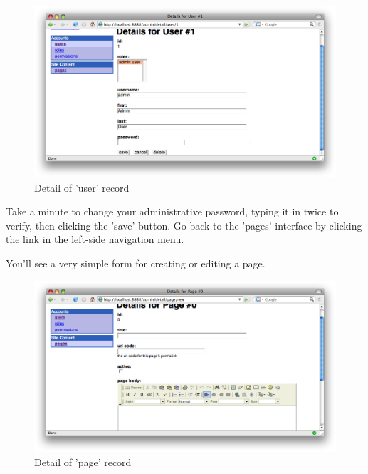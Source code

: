 \begin{figure}[ht]
\centering
\includegraphics[width=1\textwidth]{images/admin-intro/05-user-detail.png}
\caption{Detail of 'user' record}
\end{figure}

Take a minute to change your administrative password, typing it in twice to
verify, then clicking the 'save' button. Go back to the 'pages' interface by
clicking the link in the left-side navigation menu.

You'll see a very simple form for creating or editing a page.

\begin{figure}[ht]
\centering
\includegraphics[width=1\textwidth]{images/admin-intro/06-page-detail.png}
\caption{Detail of 'page' record}
\end{figure}

